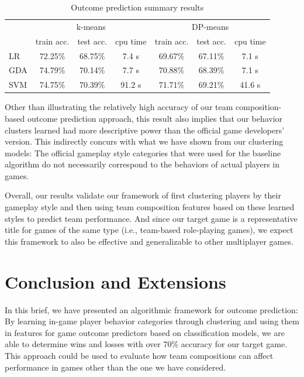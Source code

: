 \documentclass[letterpaper,10 pt,conference]{ieeeconf}
\begin{document}
\begin{table}[htbp!]
  \centering
  \caption{Outcome prediction summary results}
  \begin{tabular}{lcccccc}
    \toprule
    & \multicolumn{3}{c}{k-means} & \multicolumn{3}{c}{DP-means} \\
    & train acc. & test acc. & cpu time & train acc. & test acc. & cpu time \\ \midrule
    LR & 72.25\% & 68.75\% & 7.4 s & 69.67\% & 67.11\% & 7.1 s \\
    GDA & 74.79\% & 70.14\% & 7.7 s & 70.88\% & 68.39\% & 7.1 s \\
    SVM & 74.75\% & 70.39\% & 91.2 s & 71.71\% & 69.21\% & 41.6 s \\
    \bottomrule
  \end{tabular}
  \label{tab:pred}
\end{table}

Other than illustrating the relatively high accuracy of our team composition-based outcome prediction approach, this result also implies that our behavior clusters learned had more descriptive power than the official game developers' version. This indirectly concurs with what we have shown from our clustering models: The official gameplay style categories that were used for the baseline algorithm do not necessarily correspond to the behaviors of actual players in games. 

Overall, our results validate our framework of first clustering players by their gameplay style and then using team composition features based on these learned styles to predict team performance. And since our target game is a representative title for games of the same type (i.e., team-based role-playing games), we expect this framework to also be effective and generalizable to other multiplayer games. 

\section{Conclusion and Extensions}

In this brief, we have presented an algorithmic framework for outcome prediction: By learning in-game player behavior categories through clustering and using them in features for game outcome predictors based on classification models, we are able to determine wins and losses with over 70\% accuracy for our target game. This approach could be used to evaluate how team compositions can affect performance in games other than the one we have considered.
\end{document}
